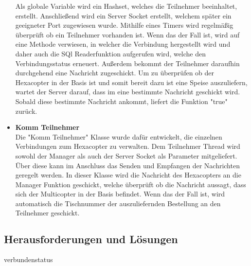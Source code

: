 \begin{itemize}
Als globale Variable wird ein Hashset, welches die Teilnehmer beeinhaltet, erstellt. 
Anschließend wird ein Server Socket erstellt, welchem später ein geeigneter Port zugewiesen wurde.
Mithilfe eines Timers wird regelmäßig überprüft ob ein Teilnehmer vorhanden ist. Wenn das der Fall ist, wird auf eine  Methode verwiesen, in welcher die Verbindung hergestellt wird und daher auch die SQl Readerfunktion aufgerufen wird, welche den Verbindungsstatus erneuert. Außerdem bekommt der Teilnehmer daraufhin durchgehend eine Nachricht zugeschickt.
Um zu überprüfen ob der Hexacopter in der Basis ist und somit bereit dazu ist eine Speise auszuliefern, wartet der Server darauf, dass im eine bestimmte Nachricht geschickt wird. Sobald diese bestimmte Nachricht ankommt, liefert die Funktion "true" zurück.
    \item \textbf{Komm Teilnehmer}\\
Die "Komm Teilnehmer" Klasse wurde dafür entwickelt, die einzelnen Verbindungen zum Hexacopter zu verwalten.
Dem Teilnehmer Thread wird sowohl der Manager als auch der Server Socket als Parameter mitgeliefert. Über diese kann im Anschluss das Senden und Empfangen der Nachrichten geregelt werden. 
In dieser Klasse wird die Nachricht des Hexacopters an die Manager Funktion geschickt, welche überprüft ob die Nachricht aussagt, dass sich der Multicopter in der Basis befindet. Wenn das der Fall ist, wird automatisch die Tischnummer der auszuliefernden Bestellung an den Teilnehmer geschickt.
  \end{itemize}

  \subsection{Herausforderungen und Lösungen}
verbundenstatus